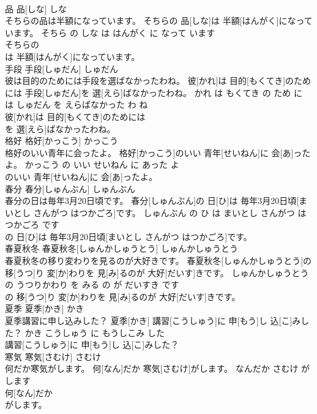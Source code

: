 \documentclass[8pt]{extreport}
\begin{document}
\begin{CJK}{UTF8}{min}
\\	品	品[しな]	しな	
\\	そちらの品は半額になっています。	そちらの 品[しな]は 半額[はんがく]になっています。	そちら の しな は はんがく に なって います	
\\	そちらの
\\	は 半額[はんがく]になっています。			
\\	手段	手段[しゅだん]	しゅだん	
\\	彼は目的のためには手段を選ばなかったわね。	彼[かれ]は 目的[もくてき]のためには 手段[しゅだん]を 選[えら]ばなかったわね。	かれ は もくてき の ため に は しゅだん を えらばなかった わ ね	
\\	彼[かれ]は 目的[もくてき]のためには
\\	を 選[えら]ばなかったわね。			
\\	格好	格好[かっこう]	かっこう	
\\	格好のいい青年に会ったよ。	格好[かっこう]のいい 青年[せいねん]に 会[あ]ったよ。	かっこう の いい せいねん に あった よ	
\\	のいい 青年[せいねん]に 会[あ]ったよ。			
\\	春分	春分[しゅんぶん]	しゅんぶん	
\\	春分の日は毎年3月20日頃です。	春分[しゅんぶん]の 日[ひ]は 毎年3月20日頃[まいとし さんがつ はつかごろ]です。	しゅんぶん の ひ は まいとし さんがつ はつかごろ です	
\\	の 日[ひ]は 毎年3月20日頃[まいとし さんがつ はつかごろ]です。			
\\	春夏秋冬	春夏秋冬[しゅんかしゅうとう]	しゅんかしゅうとう	
\\	春夏秋冬の移り変わりを見るのが大好きです。	春夏秋冬[しゅんかしゅうとう]の 移[うつ]り 変[か]わりを 見[み]るのが 大好[だいす]きです。	しゅんかしゅうとう の うつりかわり を みる の が だいすき です	
\\	の 移[うつ]り 変[か]わりを 見[み]るのが 大好[だいす]きです。			
\\	夏季	夏季[かき]	かき	
\\	夏季講習に申し込みした？	夏季[かき] 講習[こうしゅう]に 申[もう]し 込[こ]みした？	かき こうしゅう に もうしこみ した 
\\	講習[こうしゅう]に 申[もう]し 込[こ]みした？			
\\	寒気	寒気[さむけ]	さむけ	
\\	何だか寒気がします。	何[なん]だか 寒気[さむけ]がします。	なんだか さむけ が します	
\\	何[なん]だか
\\	がします。			

\end{CJK}
\end{document}
